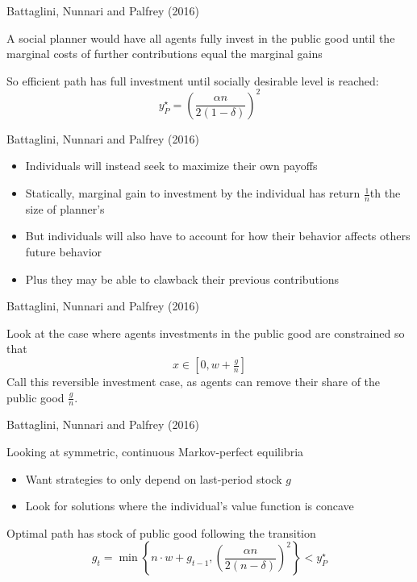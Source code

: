 \documentclass{beamer}
\begin{document}
\begin{frame}{Battaglini, Nunnari and Palfrey (2016)}
\begin{card}
 A social planner would have all agents fully invest in the public good until the marginal costs of further contributions equal the marginal gains
 \end{card}
\begin{card}
So efficient path has full investment until socially desirable level  is reached:
		$$	y^\star_P=\left(\dfrac{\alpha n}{2(1-\delta)}\right)^2$$
\end{card}
\end{frame}

\begin{frame}{Battaglini, Nunnari and Palfrey (2016)}
\begin{card}
	\begin{itemize}
		\item Individuals will instead seek to maximize their own payoffs
		\item Statically, marginal gain to investment by the individual has return $\tfrac{1}{n}$th the size of planner's \pause
		\item But individuals will also have to account for how their behavior affects others future behavior\pause
		\item Plus they may be able to clawback their previous contributions
	\end{itemize}
\end{card}
\end{frame}

\begin{frame}{Battaglini, Nunnari and Palfrey (2016)}
	\begin{card}
Look at the case where agents investments in the public good are constrained so that
		$$ x\in\left[0,w+\tfrac{g}{n}\right] $$
 Call this reversible investment case, as agents can remove their share of the public good $\tfrac{g}{n}$.
\end{card}
\end{frame}

\begin{frame}{Battaglini, Nunnari and Palfrey (2016)}
	\begin{card}
		Looking at symmetric, continuous Markov-perfect equilibria
		\begin{itemize}
			\item Want strategies to only depend on last-period stock $g$
			\item Look for solutions where the individual's value function is concave
		\end{itemize}
		\end{card} \pause
		\begin{card} Optimal path has stock of public good following the transition
			$$g_t=\min\left\{n\cdot w+g_{t-1} , \left(\dfrac{\alpha n}{2(n-\delta)}\right)^2  \right\}<y^\star_P $$
	\end{card}
\end{frame}
\end{document}
